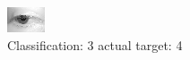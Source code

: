 \begin{figure}[h!]
\begin{center}
\includegraphics[width=0.60\columnwidth]{figures/ID2630_class_3_target_4.png}
\end{center}
\caption{ Classification: 3 actual target: 4}
\label{fig:ID2630_class_3_target_4}
\end{figure}
